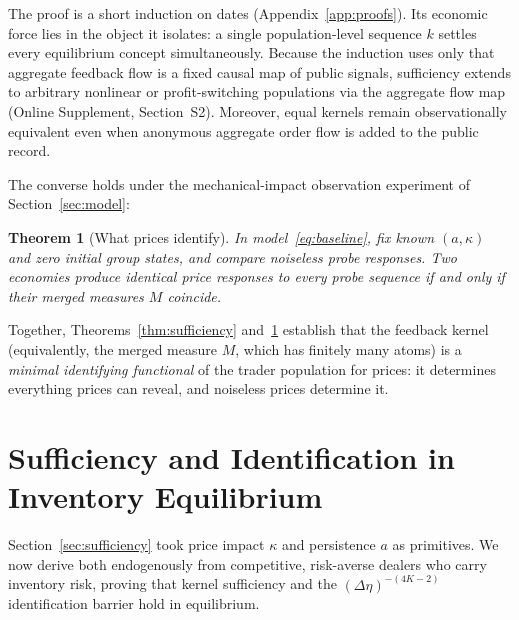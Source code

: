 \documentclass[11pt,letterpaper]{article}
\newtheorem{theorem}{Theorem}[section]
\theoremstyle{definition}
\begin{document}
The proof is a short induction on dates (Appendix~\ref{app:proofs}). Its economic force lies in the object it isolates: a single population-level sequence $k$ settles every equilibrium concept simultaneously. Because the induction uses only that aggregate feedback flow is a fixed causal map of public signals, sufficiency extends to arbitrary nonlinear or profit-switching populations via the aggregate flow map (Online Supplement, Section~S2). Moreover, equal kernels remain observationally equivalent even when anonymous aggregate order flow is added to the public record.

The converse holds under the mechanical-impact observation experiment of Section~\ref{sec:model}:

\begin{theorem}[What prices identify]\label{thm:what-id}
In model~\eqref{eq:baseline}, fix known $(a, \kappa)$ and zero initial group states, and compare noiseless probe responses. Two economies produce identical price responses to every probe sequence if and only if their merged measures $M$ coincide.
\end{theorem}

Together, Theorems~\ref{thm:sufficiency} and~\ref{thm:what-id} establish that the feedback kernel (equivalently, the merged measure $M$, which has finitely many atoms) is a \emph{minimal identifying functional} of the trader population for prices: it determines everything prices can reveal, and noiseless prices determine it.

\section{Sufficiency and Identification in Inventory Equilibrium}\label{sec:equilibrium}

Section~\ref{sec:sufficiency} took price impact $\kappa$ and persistence $a$ as primitives. We now derive both endogenously from competitive, risk-averse dealers who carry inventory risk, proving that kernel sufficiency and the $(\Delta\eta)^{-(4K-2)}$ identification barrier hold in equilibrium.
\end{document}
